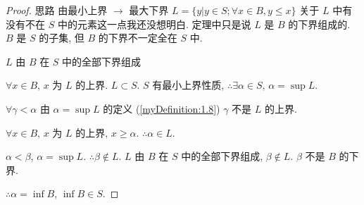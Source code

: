 
    \begin{proof}
思路 由最小上界 $\rightarrow $ 最大下界
$L = \{y| y\in S; \forall x\in B, y\leq x\}$
    关于 $L$ 中有没有不在 $S$ 中的元素这一点我还没想明白. 定理中只是说 $L$ 是 $B$ 的下界组成的. $B$ 是 $S$ 的子集, 但 $B$ 的下界不一定全在 $S$ 中. 

$L$ 由 $B$ 在 $S$ 中的全部下界组成

$\forall x\in B$, $x$ 为 $L$ 的上界. $L\subset S$.
$S$ 有最小上界性质,
$\therefore \exists \alpha\in S$, $\alpha = \sup L$.

$\forall \gamma <\alpha$ 由 $\alpha = \sup L$ 的定义 (\ref{myDefinition:1.8})
$\gamma$ 不是 $L$ 的上界.

$\forall x \in B$, $x$ 为 $L$ 的上界, $x \geq \alpha$. $\therefore \alpha \in L$.

$\alpha < \beta$, $\alpha = \sup L$. $\therefore \beta \not\in L$.
$L$ 由 $B$ 在 $S$ 中的全部下界组成, $\beta \not\in L$.
$\beta$ 不是 $B$ 的下界.

$\therefore \alpha = \inf B$, $\inf B\in S$.
    \end{proof}

